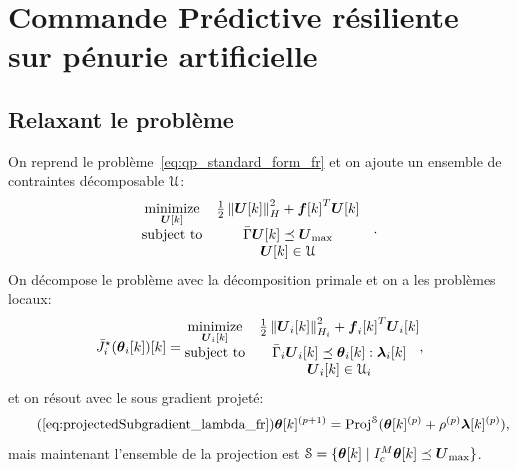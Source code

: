 \documentclass[../main.tex]{subfiles}
\begin{document}
\newpage
\section{Commande Prédictive résiliente sur pénurie artificielle}\label{sec:comm-pred-resil-1}

\subsection{Relaxant le problème}\label{sec:not-so-deprived_fr}
On reprend le problème~\eqref{eq:qp_standard_form_fr} et on ajoute un ensemble de contraintes décomposable $\mathcal{U}$:
\begin{equation}
  \label{eq:qp_standard_form_again_set_constraint_fr}
  \begin{aligned}
    \begin{matrix}
      \mathop{\textrm{minimize}}\limits_{\boldsymbol{U}[k]} &
                                      \frac{1}{2}\left\lVert\boldsymbol{U}[k]\right\rVert^{2}_{H} + {\boldsymbol{f}[k]}^{T}\boldsymbol{U}[k] &\\
      \mathrm{subject~ to} & \bar{\Gamma}\boldsymbol{U}[k]\preceq {\boldsymbol{U}}_{\text{max}} \\
                                    & \boldsymbol{U}[k]\in \mathcal{U}
    \end{matrix}
  \end{aligned}.
\end{equation}
On décompose le problème avec la décomposition primale et on a les problèmes locaux:
\begin{equation}
  \label{eq:DOP_local_set_constraint_fr}
  \eqoptobji(\thetaik)[k]=
  \begin{matrix}
    \minimize\limits_{\vec{U}_{i}[k]}&\frac{1}{2}\norm{\vec{U}_{i}[k]}^{2}_{H_{i}} + {\vec{f}_{i}[k]}^{T}\vec{U}_{i}[k]\\
    \mathrm{subject~ to} & \bar{\Gamma}_{i}\vec{U}_{i}[k] \preceq \thetaik:\lambdaik\\
                                     & \vec{U}_{i}[k]\in \set{U}_{i}
  \end{matrix},
\end{equation}
et on résout avec le sous gradient projeté:
\begin{equation}
  \label{eq:projectedSubgradient_lambda_reprise_fr}
  \tag{\ref*{eq:projectedSubgradient_lambda_fr}}
  \vec{\theta}[k]\pplusone=\Proj^{\set{S}}(\vec{\theta}[k]\p+\rho\p\vec{\lambda}[k]\p),
\end{equation}
mais maintenant l'ensemble de la projection est ${\mathcal{S} = \{\boldsymbol{\theta}[k]\mid I_{c}^{M}\boldsymbol{\theta}[k]\preceq \boldsymbol{U}_{\max}\}}$.
\end{document}
